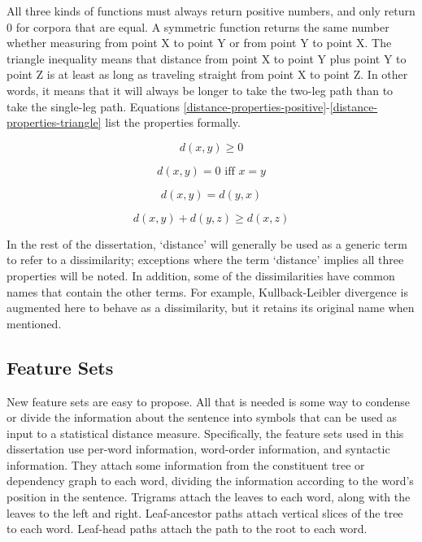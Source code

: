 All three kinds of functions must always return positive numbers, and
only return 0 for corpora that are equal.  A symmetric function
returns the same number whether measuring from point X to point Y or
from point Y to point X. The triangle inequality means that distance
from point X to point Y plus point Y to point Z is at least as long as
traveling straight from point X to point Z.  In other words, it means
that it will always be longer to take the two-leg path than to take
the single-leg path. Equations
\ref{distance-properties-positive}-\ref{distance-properties-triangle}
list the properties formally.

\begin{equation}
  d(x,y) \ge 0
  \label{distance-properties-positive}
\end{equation}

\begin{equation}
 d(x,y) = 0 \textrm{ iff } x=y
\end{equation}

\begin{equation}
  d(x,y) = d(y,x)
\end{equation}

\begin{equation}
  d(x,y) + d(y,z) \ge d(x,z)
\label{distance-properties-triangle}
\end{equation}

In the rest of the dissertation, `distance' will generally be used as
a generic term to refer to a dissimilarity; exceptions where the term `distance'
implies all three properties will be noted. In addition, some of the
dissimilarities have common names that contain the other terms. For
example, Kullback-Leibler divergence is augmented here to behave as a
dissimilarity, but it retains its original name when
mentioned.

\subsection{Feature Sets}

New feature sets are easy to propose. All that is needed is some way to
condense or divide the information about the sentence into symbols
that can be used as input to a statistical distance
measure. Specifically, the feature sets used in this dissertation use
per-word information, word-order information, and syntactic
information. They attach some information from the constituent tree or
dependency graph to each word, dividing the information according to
the word's position in the sentence. Trigrams attach the leaves to
each word, along with the leaves to the left and right.
Leaf-ancestor paths attach vertical slices of the tree to each
word. Leaf-head paths attach the path to the root to each word.

